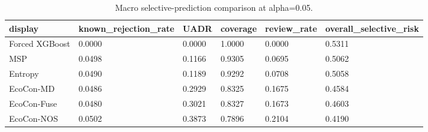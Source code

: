 \begin{table}
\caption{Macro selective-prediction comparison at alpha=0.05.}
\label{tab:table05_final_macro_comparison}
\begin{tabular}{llllll}
\toprule
display & known\_rejection\_rate & UADR & coverage & review\_rate & overall\_selective\_risk \\
\midrule
Forced XGBoost & 0.0000 & 0.0000 & 1.0000 & 0.0000 & 0.5311 \\
MSP & 0.0498 & 0.1166 & 0.9305 & 0.0695 & 0.5062 \\
Entropy & 0.0490 & 0.1189 & 0.9292 & 0.0708 & 0.5058 \\
EcoCon-MD & 0.0486 & 0.2929 & 0.8325 & 0.1675 & 0.4584 \\
EcoCon-Fuse & 0.0480 & 0.3021 & 0.8327 & 0.1673 & 0.4603 \\
EcoCon-NOS & 0.0502 & 0.3873 & 0.7896 & 0.2104 & 0.4190 \\
\bottomrule
\end{tabular}
\end{table}
